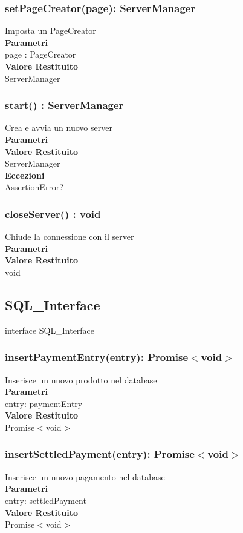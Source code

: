 \documentclass[a4paper, 12pt]{article}
\begin{document}
\subsubsection{setPageCreator(page): ServerManager}
Imposta un PageCreator\\
\textbf{Parametri}\\
page : PageCreator\\
\textbf{Valore Restituito}\\
ServerManager
\subsubsection{start() : ServerManager}
Crea e avvia un nuovo server\\
\textbf{Parametri}\\
\textbf{Valore Restituito}\\
ServerManager\\
\textbf{Eccezioni}\\
AssertionError?
\subsubsection{closeServer() : void}
Chiude la connessione con il server\\
\textbf{Parametri}\\
\textbf{Valore Restituito}\\
void

\subsection{SQL\_Interface}
interface SQL\_Interface
\subsubsection{insertPaymentEntry(entry): Promise$<$void$>$}
Inserisce un nuovo prodotto nel database\\
\textbf{Parametri}\\
entry: paymentEntry\\
\textbf{Valore Restituito}\\
Promise$<$void$>$
\subsubsection{insertSettledPayment(entry): Promise$<$void$>$}
Inserisce un nuovo pagamento nel database\\
\textbf{Parametri}\\
entry: settledPayment\\
\textbf{Valore Restituito}\\
Promise$<$void$>$
\end{document}
